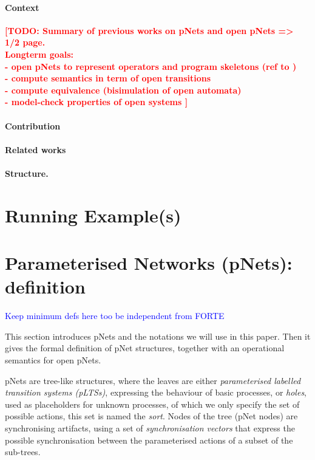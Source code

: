 \documentclass{lncs/llncs}
\newcommand{\TODO}[1]{\textcolor{red}{\textbf{[TODO:#1]}}}
\newcommand{\ERIC}[1]{\textcolor{blue}{#1}}
\begin{document}
\paragraph{Context}
\TODO{
  Summary of previous works on pNets and open pNets => 1/2 page.\\
  Longterm goals:\\
  - open pNets to represent operators and program skeletons (ref to
  \cite{PDP2015})\\
  - compute semantics in term of open transitions\\
  - compute equivalence (bisimulation of open automata)\\
  - model-check properties of open systems
  }
\paragraph{Contribution}

\paragraph{Related works}



\paragraph{Structure.}

\section{Running Example(s)}

\section{Parameterised Networks (pNets): definition}
\label{section:pnets}

\ERIC{Keep minimum defs here too be independent from FORTE}

This section introduces pNets and the notations we will use in
this paper. Then it gives the formal definition of pNet structures,
together with an operational semantics for open pNets.

pNets are tree-like structures, where the leaves are either
\emph{parameterised labelled transition systems (pLTSs)}, expressing the
behaviour of basic processes, or \emph{holes}, used as placeholders
for unknown processes, of which we only specify the set of possible
actions, this set is named the \emph{sort}.
Nodes of the tree (pNet nodes) are synchronising artifacts, using a
set of \emph{synchronisation vectors} that express the possible
synchronisation between the parameterised actions of a subset of the
sub-trees.
\end{document}

